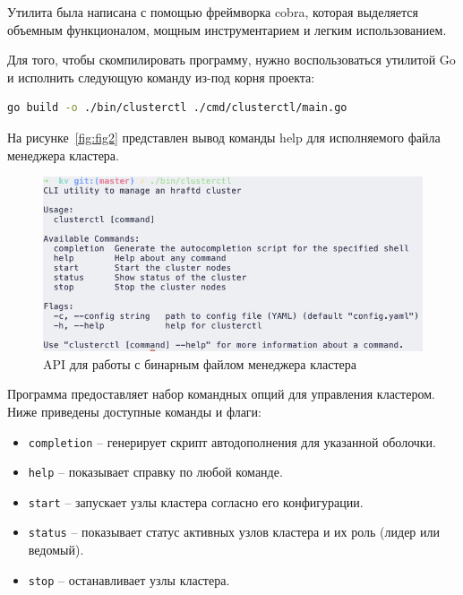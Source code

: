 Утилита была написана с помощью фреймворка cobra, которая выделяется объемным функционалом, мощным инструментарием и легким
использованием.

Для того, чтобы скомпилировать программу, нужно воспользоваться утилитой Go и исполнить следующую команду из-под корня проекта:

\begin{lstlisting}[frame=rlbt,language=Bash,caption={Сборка консольной утилиты clusterctl}]
go build -o ./bin/clusterctl ./cmd/clusterctl/main.go
\end{lstlisting}

На рисунке~\ref{fig:fig2} представлен вывод команды help для исполняемого файла менеджера кластера.

\begin{figure}
  \centering
  \includegraphics[scale=0.6]{assets/clusterctl.png}
  \caption{API для работы с бинарным файлом менеджера кластера}
  \label{fig:fig3}
\end{figure}

Программа предоставляет набор командных опций для управления кластером. Ниже приведены доступные команды и флаги:

\begin{itemize}
    \item \texttt{completion} -- генерирует скрипт автодополнения для указанной оболочки.
    
    \item \texttt{help} -- показывает справку по любой команде.
    
    \item \texttt{start} -- запускает узлы кластера согласно его конфигурации.
    
    \item \texttt{status} -- показывает статус активных узлов кластера и их роль (лидер или ведомый).
    
    \item \texttt{stop} -- останавливает узлы кластера.
\end{itemize}

